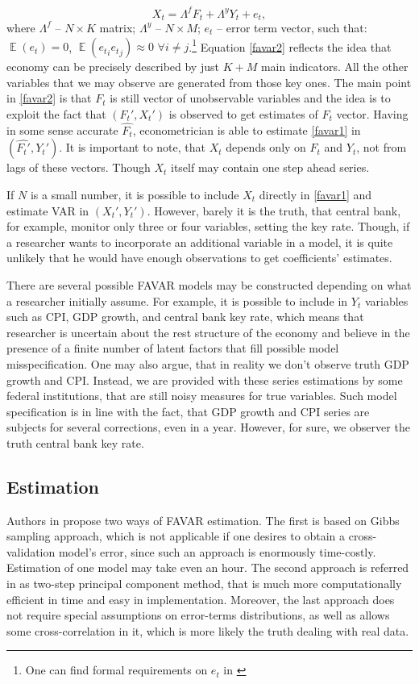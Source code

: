 \documentclass[a4paper, 14pt]{article}
\DeclareMathOperator*{\E}{\mathbb{E}}
\begin{document}
\begin{equation}\label{favar2}
X_t = \Lambda^f F_t + \Lambda^y Y_t + e_t,
\end{equation}
where $\Lambda^f$ -- $N \times K$ matrix; $\Lambda^y$ -- $N \times M$; $e_t$ -- error term vector, such that: $\E(e_t) = 0$, $\E({e_t}_i {e_t}_j) \approx 0$ $\forall i \neq j$.\footnote{One can find formal requirements on $e_t$ in \cite{stock2002macroeconomic}} Equation \eqref{favar2} reflects the idea that economy can be precisely described by just $K+M$ main indicators. All the other variables that we may observe are generated from those key ones. The main point in \eqref{favar2} is that $F_t$ is still vector of unobservable variables and the idea is to exploit the fact that $(F_t', X_t')$ is observed to get estimates of $F_t$ vector. Having in some sense accurate $\hat{F_t}$, econometrician is able to estimate \eqref{favar1} in $(\hat{F_t'}, Y_t')$. It is important to note, that $X_t$ depends only on $F_t$ and $Y_t$, not from lags of these vectors. Though $X_t$ itself may contain one step ahead series. 

If $N$ is a small number, it is possible to include $X_t$ directly in \eqref{favar1} and estimate VAR in $({X_t'}, Y_t')$. However, barely it is the truth, that central bank, for example, monitor only three or four variables, setting the key rate. Though, if a researcher wants to incorporate an additional variable in a model, it is quite unlikely that he would have enough observations to get coefficients' estimates. 

There are several possible FAVAR models may be constructed depending on what a researcher initially assume. For example, it is possible to include in $Y_t$ variables such as CPI, GDP growth, and central bank key rate, which means that researcher is uncertain about the rest structure of the economy and believe in the presence of a finite number of latent factors that fill possible model misspecification. One may also argue, that in reality we don't observe truth GDP growth and CPI. Instead, we are provided with these series estimations by some federal institutions, that are still noisy measures for true variables. Such model specification is in line with the fact, that GDP growth and CPI series are subjects for several corrections, even in a year. However, for sure, we observer the truth central bank key rate.

\subsection{Estimation}
Authors in \cite{bernanke2005measuring} propose two ways of FAVAR estimation. The first is based on Gibbs sampling approach, which is not applicable if one desires to obtain a cross-validation model's error, since such an approach is enormously time-costly. Estimation of one model may take even an hour.  The second approach is referred in \cite{bernanke2005measuring} as two-step principal component method, that is much more computationally efficient in time and easy in implementation. Moreover, the last approach does not require special assumptions on error-terms distributions, as well as allows some cross-correlation in it, which is more likely the truth dealing with real data.
\end{document}
